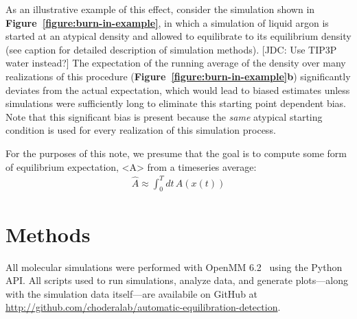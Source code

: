 \documentclass[aps,pre,twocolumn,nofootinbib,superscriptaddress,linenumbers,11point]{revtex4-1}
\begin{document}
As an illustrative example of this effect, consider the simulation shown in {\bf Figure~\ref{figure:burn-in-example}}, in which a simulation of liquid argon is started at an atypical density and allowed to equilibrate to its equilibrium density (see caption for detailed description of simulation methods).
{\color{red}[JDC: Use TIP3P water instead?]}
The expectation of the running average of the density over many realizations of this procedure ({\bf Figure~\ref{figure:burn-in-example}b}) significantly deviates from the actual expectation, which would lead to biased estimates unless simulations were sufficiently long to eliminate this starting point dependent bias.
Note that this significant bias is present because the \emph{same} atypical starting condition is used for every realization of this simulation process.

For the purposes of this note, we presume that the goal is to compute some form of equilibrium expectation, <A> from a timeseries average:
\begin{eqnarray}
\hat{A} \approx \int_0^T dt \, A(x(t))
\end{eqnarray}


\begin{figure*} 
\caption{\label{figure:burn-in-example} {\bf Illustration of the motivation for discarding data to equilibration in computing expectations from molecular simulations.} 
This is text.}
\end{figure*}


\section*{Methods}
\label{section:methods}

All molecular simulations were performed with OpenMM 6.2~\cite{eastman:jctc:2012:openmm} using the Python API.
All scripts used to run simulations, analyze data, and generate plots---along with the simulation data itself---are availabile on GitHub at \url{http://github.com/choderalab/automatic-equilibration-detection}.
\end{document}
